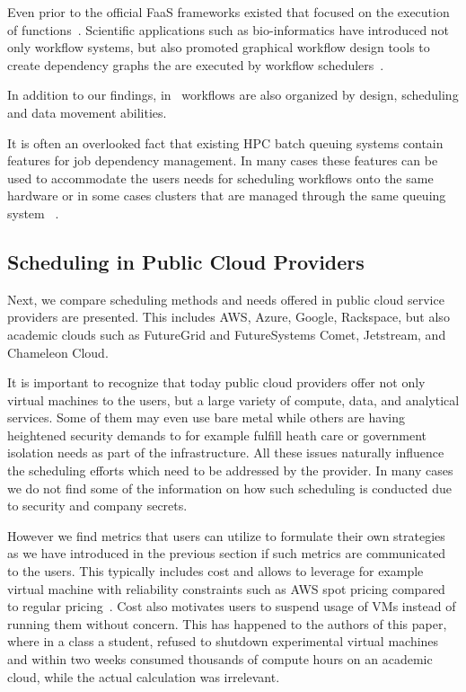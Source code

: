 \documentclass[final,5p,times,twocolumn]{elsarticle}
\begin{document}
 Even prior
to the official FaaS frameworks existed that focused on the execution
of functions~\cite{las-infogram}.  Scientific applications such as
bio-informatics have introduced not only workflow systems, but also
promoted graphical workflow design tools to create dependency graphs
the are executed by workflow
schedulers~\cite{oinn2004taverna,tan2010comparison}.
  
In addition to our findings, in~\cite{yu2005taxonomy} workflows are
also organized by design, scheduling and data movement abilities.

It is often an overlooked fact that existing HPC batch queuing systems
contain features for job dependency management. In many cases these
features can be used to accommodate the users needs for scheduling
workflows onto the same hardware or in some cases clusters that are
managed through the same queuing
system
~\cite{www-lsf,www-moab,www-univa-GE-manual,www-pbs-manual}.







\subsection{Scheduling in Public Cloud Providers}
\label{sec:public}



Next, we compare scheduling methods and needs offered in public cloud
service providers are presented. This includes AWS, Azure, Google,
Rackspace, but also academic clouds such as FutureGrid and
FutureSystems Comet, Jetstream, and Chameleon Cloud.

It is important to recognize that today public cloud providers offer
not only virtual machines to the users, but a large variety of
compute, data, and analytical services. Some of them may even use bare
metal while others are having heightened security demands to for
example fulfill heath care or government isolation needs as part of
the infrastructure. All these issues naturally influence the
scheduling efforts which need to be addressed by the provider. In many
cases we do not find some of the information on how such scheduling is
conducted due to security and company secrets.

However we find metrics that users can utilize to formulate their own
strategies as we have introduced in the previous section if such
metrics are communicated to the users. This typically includes cost
and allows to leverage for example virtual machine with reliability
constraints such as AWS spot pricing compared to regular
pricing~\cite{AmazonEC22015}.  Cost also motivates users to suspend
usage of VMs instead of running them without concern. This has
happened to the authors of this paper, where in a class a student,
refused to shutdown experimental virtual machines and within two weeks
consumed thousands of compute hours on an academic cloud, while the
actual calculation was irrelevant.
\end{document}
